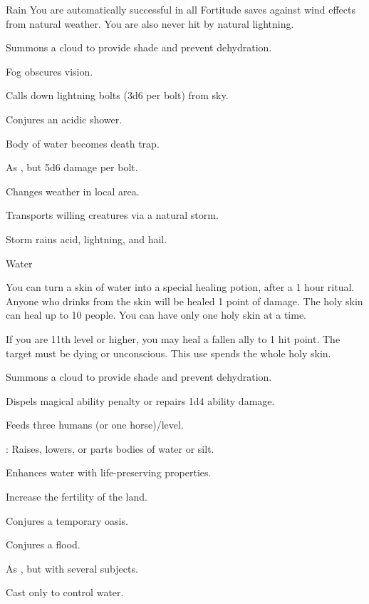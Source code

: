 {Rain}
{You are automatically successful in all Fortitude saves against wind effects from natural weather. You are also never hit by natural lightning.}
{
	\item {} Summons a cloud to provide shade and prevent dehydration.
	\item {} Fog obscures vision.
	\item {} Calls down lightning bolts (3d6 per bolt) from sky.
	\item {} Conjures an acidic shower.
	\item {} Body of water becomes death trap.
	\item {} As , but 5d6 damage per bolt.
	\item {} Changes weather in local area.
	\item {} Transports willing creatures via a natural storm.
	\item {} Storm rains acid, lightning, and hail.
}

{Water}
{You can turn a skin of water into a special healing potion, after a 1 hour ritual. Anyone who drinks from the skin will be healed 1 point of damage. The holy skin can heal up to 10 people. You can have only one holy skin at a time.

If you are 11th level or higher, you may heal a fallen ally to 1 hit point. The target must be dying or unconscious. This use spends the whole holy skin. }
{
	\item {} Summons a cloud to provide shade and prevent dehydration.
	\item {} Dispels magical ability penalty or repairs 1d4 ability damage.
	\item {} Feeds three humans (or one horse)/level.
	\item {}\footnotemark[1]: Raises, lowers, or parts bodies of water or silt.
	\item {} Enhances water with life-preserving properties.
	\item {} Increase the fertility of the land.
	\item {} Conjures a temporary oasis.
	\item {} Conjures a flood.
	\item {} As , but with several subjects.
}
 Cast only to control water.

